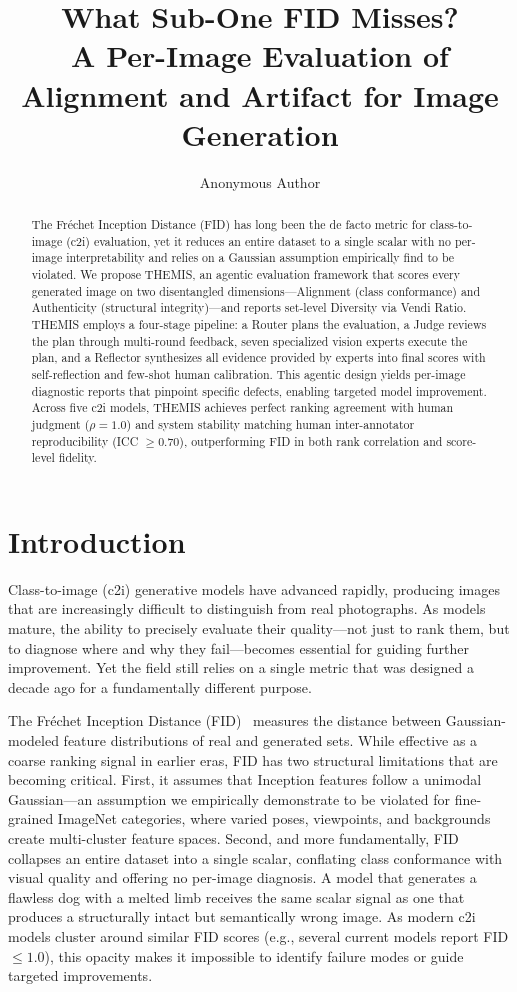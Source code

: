\documentclass[letterpaper]{article}
\title{What Sub-One FID Misses?\\
A Per-Image Evaluation of Alignment and Artifact for Image Generation}
\author{Anonymous Author}
\begin{document}
\maketitle

\begin{abstract}
The Fr\'echet Inception Distance (FID) has long been the de facto metric for class-to-image (c2i) evaluation, yet it reduces an entire dataset to a single scalar with no per-image interpretability and relies on a Gaussian assumption empirically find to be violated. We propose THEMIS, an agentic evaluation framework that scores every generated image on two disentangled dimensions---Alignment (class conformance) and Authenticity (structural integrity)---and reports set-level Diversity via Vendi Ratio. THEMIS employs a four-stage pipeline: a Router plans the evaluation, a Judge reviews the plan through multi-round feedback, seven specialized vision experts execute the plan, and a Reflector synthesizes all evidence provided by experts into final scores with self-reflection and few-shot human calibration. This agentic design yields per-image diagnostic reports that pinpoint specific defects, enabling targeted model improvement. Across five c2i models, THEMIS achieves perfect ranking agreement with human judgment ($\rho = 1.0$) and system stability matching human inter-annotator reproducibility (ICC $\geq 0.70$), outperforming FID in both rank correlation and score-level fidelity.
\end{abstract}

\section{Introduction}

Class-to-image (c2i) generative models have advanced rapidly, producing images that are increasingly difficult to distinguish from real photographs. As models mature, the ability to precisely evaluate their quality---not just to rank them, but to diagnose where and why they fail---becomes essential for guiding further improvement. Yet the field still relies on a single metric that was designed a decade ago for a fundamentally different purpose.

The Fr\'echet Inception Distance (FID)~\citep{heusel2017gans} measures the distance between Gaussian-modeled feature distributions of real and generated sets. While effective as a coarse ranking signal in earlier eras, FID has two structural limitations that are becoming critical. First, it assumes that Inception features follow a unimodal Gaussian---an assumption we empirically demonstrate to be violated for fine-grained ImageNet categories, where varied poses, viewpoints, and backgrounds create multi-cluster feature spaces. Second, and more fundamentally, FID collapses an entire dataset into a single scalar, conflating class conformance with visual quality and offering no per-image diagnosis. A model that generates a flawless dog with a melted limb receives the same scalar signal as one that produces a structurally intact but semantically wrong image. As modern c2i models cluster around similar FID scores (e.g., several current models report FID $\leq 1.0$), this opacity makes it impossible to identify failure modes or guide targeted improvements.
\end{document}
